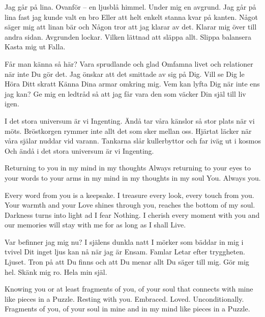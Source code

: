 \startpoem
Jag går på lina.
Ovanför – en ljusblå himmel.
Under mig en avgrund.
Jag går på lina fast jag kunde valt en bro
Eller att helt enkelt stanna kvar på kanten.
Något säger mig att linan bär och
Någon tror att jag klarar av det. 
Klarar mig över till andra sidan.
Avgrunden lockar.
Vilken lättnad att släppa allt.
Slippa balansera
Kasta mig ut
Falla.
\stoppoem

\startpoem
Får man känna så här? 
Vara sprudlande och glad
Omfamna livet och relationer
när inte Du gör det.
Jag önskar att det smittade av sig på Dig.
Vill se Dig le
Höra Ditt skratt
Känna Dina armar omkring mig.
Vem kan lyfta Dig när inte ens jag kan?
Ge mig en ledtråd
så att jag får vara den som väcker
Din själ till liv igen.
\stoppoem

\startpoem
I det stora universum är vi 
Ingenting.
Ändå tar våra känslor så stor plats när vi möts.
Bröstkorgen rymmer inte allt det som sker 
mellan oss.
Hjärtat läcker när våra själar 
nuddar vid varann.
Tankarna slår kullerbyttor och far iväg
ut i kosmos 
Och ändå i det stora universum är vi 
Ingenting.
\stoppoem

\startpoem
Returning 
to you
in my mind
in my thoughts
Always returning
to your eyes
to your words
to your arms
in my mind
in my thoughts
in my soul
You.
Always you.
\stoppoem

\startpoem
Every word from you is a keepsake.
I treasure every look, every touch from you.
Your warmth and your
Love shines through you,
reaches the bottom of my soul.
Darkness turns into light ad I fear
Nothing.
I cherish every moment with you and
our memories will stay with me
for as long as I shall
Live.
\stoppoem

\startpoem
Var befinner jag mig nu?
I själens dunkla natt
I mörker som bäddar in mig i tvivel
Dit inget ljus kan nå när jag är 
Ensam.
Famlar
Letar efter tryggheten.
Ljuset.
Tron på att Du finns
och att Du menar allt Du säger till mig.
Gör mig hel.
Skänk mig ro.
Hela min själ.
\stoppoem

\startpoem
Knowing you
or at least fragments of you,
of your soul that 
connects with mine
like pieces in a 
Puzzle.
Resting with you.
Embraced.
Loved.
Unconditionally.
Fragments of you,
of your soul
in mine
and in my mind
like pieces in a
Puzzle.
\stoppoem

